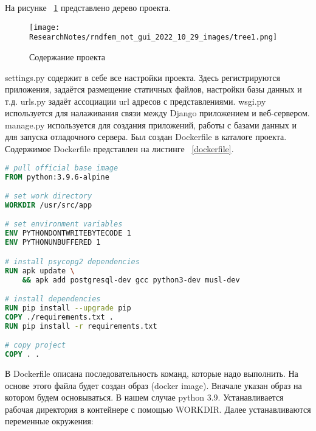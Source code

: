 \def\notedate{2022.10.29}
\def\currentauthor{Василян А.Р. (РК6-73Б)}

На рисунке ~\ref{picture1} представлено дерево проекта.
\begin{figure}[!ht]
  \centering
  \texttt{[image: ResearchNotes/rndfem\_not\_gui\_2022\_10\_29\_images/tree1.png]}
  \caption{Содержание проекта}
  \label{picture1}
\end{figure}

	\textsf{settings.py} содержит в себе все настройки проекта. Здесь регистрируются приложения, задаётся размещение статичных файлов, настройки базы данных и т.д. 
	\textsf{urls.py} задаёт ассоциации url адресов с представлениями. 
	\textsf{wsgi.py} используется для налаживания связи между Django приложением и веб-сервером.
	\textsf{manage.py} используется для создания приложений, работы с базами данных и для запуска отладочного сервера.
	Был создан \textsf{Dockerfile} в каталоге проекта. Содержимое \textsf{Dockerfile} представлен на листинге ~\ref{dockerfile}.

\begin{lstlisting}[frame=single, label={dockerfile}, caption={\textsf{Dockerfile}}, language=Dockerfile] 
# pull official base image
FROM python:3.9.6-alpine

# set work directory
WORKDIR /usr/src/app

# set environment variables
ENV PYTHONDONTWRITEBYTECODE 1
ENV PYTHONUNBUFFERED 1

# install psycopg2 dependencies
RUN apk update \
    && apk add postgresql-dev gcc python3-dev musl-dev

# install dependencies
RUN pip install --upgrade pip
COPY ./requirements.txt .
RUN pip install -r requirements.txt

# copy project
COPY . .
\end{lstlisting}

	В \textsf{Dockerfile} описана последовательность команд, которые надо выполнить. На основе этого файла будет создан образ (\textsf{docker image}). Вначале указан образ на котором будем основываться. В нашем случае python 3.9. Устанавливается рабочая директория в контейнере с помощью \textsf{WORKDIR}. Далее устанавливаются переменные окружения:

